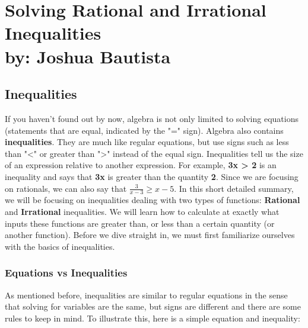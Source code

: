 \documentclass[12pt,fleqn]{book} %
\begin{document}
\part{Solving Rational and Irrational Inequalities\\ by: Joshua Bautista}


\chapter{Inequalities}

\vspace*{-10mm}

If you haven't found out by now, algebra is not only limited to solving equations (statements that are equal, indicated by the "=" sign). Algebra also contains \textbf{inequalities}. They are much like regular equations, but use signs such as less than "<" or greater than ">" instead of the equal sign. Inequalities tell us the size of an expression relative to another expression. For example, \textbf{3x > 2} is an inequality and says that \textbf{3x} is greater than the quantity \textbf{2}. Since we are focusing on rationals, we can also say that $\frac{3}{x-3}\geq x-5$. In this short detailed summary, we will be focusing on inequalities dealing with two types of functions: \textbf{Rational} and \textbf{Irrational} inequalities. We will learn how to calculate at exactly what inputs these functions are greater than, or less than a certain quantity (or another function). Before we dive straight in, we must first familiarize ourselves with the basics of inequalities. 

\section{Equations vs Inequalities}

As mentioned before, inequalities are similar to regular equations in the sense that solving for variables are the same, but signs are different and there are some rules to keep in mind. To illustrate this, here is a simple equation and inequality:
\end{document}
